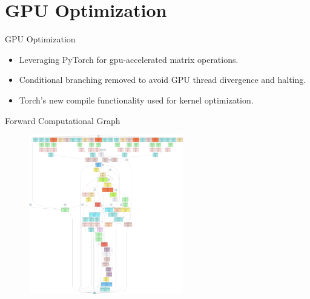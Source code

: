 \documentclass[12pt]{beamer}
\begin{document}
\section{GPU Optimization}
\begin{frame}{GPU Optimization}
    \begin{itemize}
        \item Leveraging PyTorch for gpu-accelerated matrix operations.
        \item Conditional branching removed to avoid GPU thread divergence and halting.
        \item Torch's new compile functionality used for kernel optimization.
    \end{itemize}
\end{frame}

\begin{frame}{Forward Computational Graph}
  \begin{figure}[H]
    \centering
    \includegraphics[width=0.6\textwidth]{fig/graph_diagram.pdf}
    \label{fig:speedup}
  \end{figure}
\end{frame}


\end{document}
